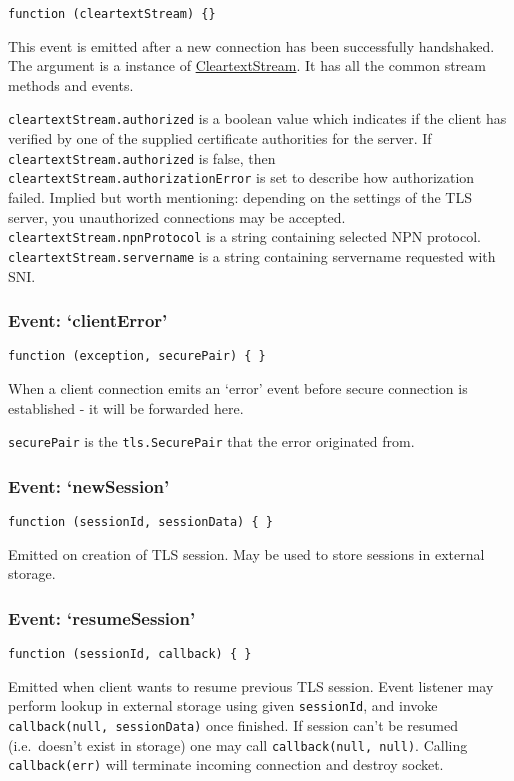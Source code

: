 \texttt{function (cleartextStream) \{\}}

This event is emitted after a new connection has been successfully
handshaked. The argument is a instance of
\hyperref[tls_class_tls_cleartextstream]{CleartextStream}. It has all
the common stream methods and events.

\texttt{cleartextStream.authorized} is a boolean value which indicates
if the client has verified by one of the supplied certificate
authorities for the server. If \texttt{cleartextStream.authorized} is
false, then \texttt{cleartextStream.authorizationError} is set to
describe how authorization failed. Implied but worth mentioning:
depending on the settings of the TLS server, you unauthorized
connections may be accepted. \texttt{cleartextStream.npnProtocol} is a
string containing selected NPN protocol.
\texttt{cleartextStream.servername} is a string containing servername
requested with SNI.

\subsubsection{Event: `clientError'}

\texttt{function (exception, securePair) \{ \}}

When a client connection emits an `error' event before secure connection
is established - it will be forwarded here.

\texttt{securePair} is the \texttt{tls.SecurePair} that the error
originated from.

\subsubsection{Event: `newSession'}

\texttt{function (sessionId, sessionData) \{ \}}

Emitted on creation of TLS session. May be used to store sessions in
external storage.

\subsubsection{Event: `resumeSession'}

\texttt{function (sessionId, callback) \{ \}}

Emitted when client wants to resume previous TLS session. Event listener
may perform lookup in external storage using given \texttt{sessionId},
and invoke \texttt{callback(null, sessionData)} once finished. If
session can't be resumed (i.e.~doesn't exist in storage) one may call
\texttt{callback(null, null)}. Calling \texttt{callback(err)} will
terminate incoming connection and destroy socket.

